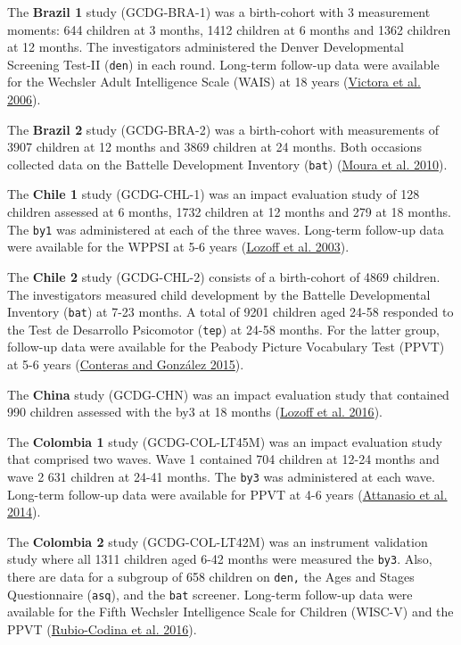 \documentclass[
]{book}
\begin{document}
The \textbf{Brazil 1} study (GCDG-BRA-1) was a birth-cohort with 3 measurement moments: 644 children at 3 months, 1412 children at 6 months and 1362 children at 12 months. The investigators administered the Denver Developmental Screening Test-II (\texttt{den}) in each round. Long-term follow-up data were available for the Wechsler Adult Intelligence Scale (WAIS) at 18 years (\protect\hyperlink{ref-Victora2006}{Victora et al. 2006}).

The \textbf{Brazil 2} study (GCDG-BRA-2) was a birth-cohort with measurements of 3907 children at 12 months and 3869 children at 24 months. Both occasions collected data on the Battelle Development Inventory (\texttt{bat}) (\protect\hyperlink{ref-Moura2010}{Moura et al. 2010}).

The \textbf{Chile 1} study (GCDG-CHL-1) was an impact evaluation study of 128 children assessed at 6 months, 1732 children at 12 months and 279 at 18 months. The \texttt{by1} was administered at each of the three waves. Long-term follow-up data were available for the WPPSI at 5-6 years (\protect\hyperlink{ref-Lozoff2003}{Lozoff et al. 2003}).

The \textbf{Chile 2} study (GCDG-CHL-2) consists of a birth-cohort of 4869 children. The investigators measured child development by the Battelle Developmental Inventory (\texttt{bat}) at 7-23 months. A total of 9201 children aged 24-58 responded to the Test de Desarrollo Psicomotor (\texttt{tep}) at 24-58 months. For the latter group, follow-up data were available for the Peabody Picture Vocabulary Test (PPVT) at 5-6 years (\protect\hyperlink{ref-conteras2015}{Conteras and González 2015}).

The \textbf{China} study (GCDG-CHN) was an impact evaluation study that contained 990 children assessed with the by3 at 18 months (\protect\hyperlink{ref-Lozoff2016}{Lozoff et al. 2016}).

The \textbf{Colombia 1} study (GCDG-COL-LT45M) was an impact evaluation study that comprised two waves. Wave 1 contained 704 children at 12-24 months and wave 2 631 children at 24-41 months. The \texttt{by3} was administered at each wave. Long-term follow-up data were available for PPVT at 4-6 years (\protect\hyperlink{ref-Attanasio2014}{Attanasio et al. 2014}).

The \textbf{Colombia 2} study (GCDG-COL-LT42M) was an instrument validation study where all 1311 children aged 6-42 months were measured the \texttt{by3}. Also, there are data for a subgroup of 658 children on \texttt{den,} the Ages and Stages Questionnaire (\texttt{asq}), and the \texttt{bat} screener. Long-term follow-up data were available for the Fifth Wechsler Intelligence Scale for Children (WISC-V) and the PPVT (\protect\hyperlink{ref-Rubio-Codina2016}{Rubio-Codina et al. 2016}).
\end{document}
